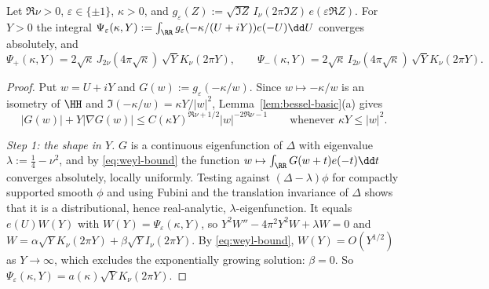 \begin{lemma}\label{lem:weyl}
Let $\Re\nu>0$, $\varepsilon\in\{\pm1\}$, $\kappa>0$, and $g_\varepsilon(Z):=\sqrt{\Im Z}\,I_\nu(2\pi\Im Z)\,e(\varepsilon\Re Z)$. For $Y>0$ the
integral $\Psi_\varepsilon(\kappa,Y):=\int_\RR g_\varepsilon(-\kappa/(U+iY))e(-U)\dd U$ converges absolutely, and
\[
\Psi_+(\kappa,Y)=2\sqrt\kappa\,J_{2\nu}(4\pi\sqrt\kappa)\,\sqrt YK_\nu(2\pi Y),\qquad
\Psi_-(\kappa,Y)=2\sqrt\kappa\,I_{2\nu}(4\pi\sqrt\kappa)\,\sqrt YK_\nu(2\pi Y).
\]
\end{lemma}

\begin{proof}
Put $w=U+iY$ and $G(w):=g_\varepsilon(-\kappa/w)$. Since $w\mapsto-\kappa/w$ is an isometry of $\HH$ and $\Im(-\kappa/w)=\kappa Y/|w|^2$,
Lemma~\ref{lem:bessel-basic}(a) gives
\begin{equation}\label{eq:weyl-bound}
|G(w)|+Y|\nabla G(w)|\le C(\kappa Y)^{\Re\nu+1/2}|w|^{-2\Re\nu-1}\qquad\text{whenever }\kappa Y\le|w|^2 .
\end{equation}

\emph{Step 1: the shape in $Y$.} $G$ is a continuous eigenfunction of $\Delta$ with eigenvalue $\lambda:=\frac14-\nu^2$, and by
\eqref{eq:weyl-bound} the function $w\mapsto\int_\RR G(w+t)e(-t)\dd t$ converges absolutely, locally uniformly. Testing against
$(\Delta-\lambda)\phi$ for compactly supported smooth $\phi$ and using Fubini and the translation invariance of $\Delta$ shows that it is a
distributional, hence real-analytic, $\lambda$-eigenfunction. It equals $e(U)W(Y)$ with $W(Y)=\Psi_\varepsilon(\kappa,Y)$, so
$Y^2W''-4\pi^2Y^2W+\lambda W=0$ and $W=\alpha\sqrt YK_\nu(2\pi Y)+\beta\sqrt YI_\nu(2\pi Y)$. By \eqref{eq:weyl-bound}, $W(Y)=O(Y^{1/2})$ as
$Y\to\infty$, which excludes the exponentially growing solution: $\beta=0$. So $\Psi_\varepsilon(\kappa,Y)=a(\kappa)\sqrt YK_\nu(2\pi Y)$.


\end{proof}
